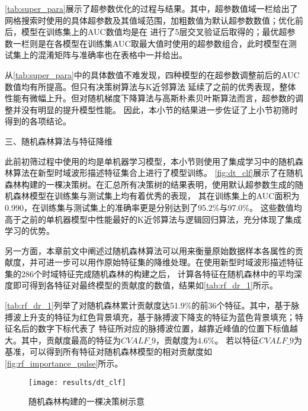 \autoref{tab:super_para}展示了超参数优化的过程与结果。其中，超参数值域一栏给出了网格搜索时使用的具体超参数及其值域范围，加粗数值为默认超参数数值；优化前后，模型在训练集上的AUC数值均是在
进行了5层交叉验证后取得的；最优超参数一栏则是在各模型在训练集AUC取最大值时使用的超参数组合，此时模型在测试集上的混淆矩阵与准确率也在表格中一并给出。

从\autoref{tab:super_para}中的具体数值不难发现，四种模型的在超参数调整前后的AUC数值均有所提高。但只有决策树算法与K近邻算法
延续了之前的优秀表现，整体性能有微幅上升。但对随机梯度下降算法与高斯朴素贝叶斯算法而言，超参数的调整并没有明显的提升模型性能。
因此，本小节的结果进一步佐证了上小节初筛时得到的各项结论。


三、随机森林算法与特征降维

此前初筛过程中使用的均是单机器学习模型，本小节则使用了集成学习中的随机森林算法在新型时域波形描述特征集合上进行了模型训练。
\autoref{fig:dt_clf}展示了在随机森林构建的一棵决策树。在汇总所有决策树的结果表明，使用默认超参数生成的随机森林模型在训练集与测试集上均有着优秀的表现，
其在训练集上的AUC面积为0.990，在训练集与测试集上的准确率更是分别达到了95.2\%与97.0\%。
这些数值均高于之前的单机器模型中性能最好的K近邻算法与逻辑回归算法，充分体现了集成学习的优势。

另一方面，本章前文中阐述过随机森林算法可以用来衡量原始数据样本各属性的贡献度，并可进一步可以用作原始特征集的降维处理。在使用新型时域波形描述特征集的286个时域特征完成随机森林的构建之后，
计算各特征在随机森林中的平均深度即可得到各特征对最终模型的贡献度的数值，结果如\autoref{tab:rf_dr_1}所示。

\autoref{tab:rf_dr_1}列举了对随机森林累计贡献度达51.9\%的前36个特征。其中，基于脉搏波上升支的特征为红色背景填充，基于脉搏波下降支的特征为蓝色背景填充；特征名后的数字下标代表了
特征所对应的脉搏波位置，越靠近峰值的位置下标值越大。其中，贡献度最高的特征为$CVALF\_9$，贡献度为4.6\%。
若以特征$CVALF\_9$为基准，可以得到所有特征对随机森林模型的相对贡献度如\autoref{fig:rf_importance_pulse}所示。
\begin{landscape}
      \begin{figure}[htbp]
            \centering
            \texttt{[image: results/dt\_clf]}
            \caption{\label{fig:dt_clf}随机森林构建的一棵决策树示意}
      \end{figure}
\end{landscape}

